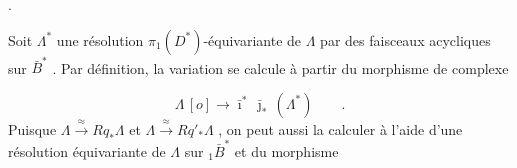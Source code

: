 \begin{center}
\quad .
\end{center}
Soit $\Lambda^*$ une résolution $\pi_1(D^*)$-équivariante de $\Lambda$ par des faisceaux acycliques sur $\bar{B}^*$ . Par définition, la variation se calcule à partir du morphisme de complexe

\begin{equation*}
\Lambda\,[o] \longrightarrow \bar{\imath}^*\, \bar{\jmath}_*\,(\Lambda^*) \qquad .
\end{equation*}
Puisque $\Lambda \stackrel{\approx}{\longrightarrow} Rq_*\Lambda$ et $\Lambda \stackrel{\approx}{\longrightarrow} Rq'_*\Lambda$ , on peut aussi la calculer  à l'aide d'une résolution équivariante de $\Lambda$ sur ${}_1\bar{B}^*$ et du morphisme

